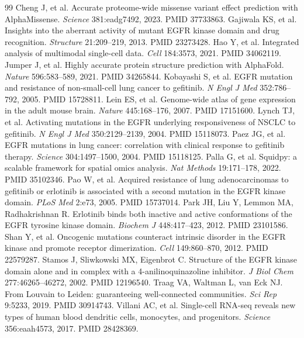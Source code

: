 \documentclass{cisXXX} %
\begin{document}
\small
\begin{thebibliography}{99}\setlength{\itemsep}{0pt}
 Cheng J, et al. Accurate proteome-wide missense variant effect prediction with AlphaMissense. \emph{Science} 381:eadg7492, 2023. PMID 37733863.
 Gajiwala KS, et al. Insights into the aberrant activity of mutant EGFR kinase domain and drug recognition. \emph{Structure} 21:209--219, 2013. PMID 23273428.
 Hao Y, et al. Integrated analysis of multimodal single-cell data. \emph{Cell} 184:3573, 2021. PMID 34062119.
 Jumper J, et al. Highly accurate protein structure prediction with AlphaFold. \emph{Nature} 596:583--589, 2021. PMID 34265844.
 Kobayashi S, et al. EGFR mutation and resistance of non-small-cell lung cancer to gefitinib. \emph{N Engl J Med} 352:786--792, 2005. PMID 15728811.
 Lein ES, et al. Genome-wide atlas of gene expression in the adult mouse brain. \emph{Nature} 445:168--176, 2007. PMID 17151600.
 Lynch TJ, et al. Activating mutations in the EGFR underlying responsiveness of NSCLC to gefitinib. \emph{N Engl J Med} 350:2129--2139, 2004. PMID 15118073.
 Paez JG, et al. EGFR mutations in lung cancer: correlation with clinical response to gefitinib therapy. \emph{Science} 304:1497--1500, 2004. PMID 15118125.
 Palla G, et al. Squidpy: a scalable framework for spatial omics analysis. \emph{Nat Methods} 19:171--178, 2022. PMID 35102346.
 Pao W, et al. Acquired resistance of lung adenocarcinomas to gefitinib or erlotinib is associated with a second mutation in the EGFR kinase domain. \emph{PLoS Med} 2:e73, 2005. PMID 15737014.
 Park JH, Liu Y, Lemmon MA, Radhakrishnan R. Erlotinib binds both inactive and active conformations of the EGFR tyrosine kinase domain. \emph{Biochem J} 448:417--423, 2012. PMID 23101586.
 Shan Y, et al. Oncogenic mutations counteract intrinsic disorder in the EGFR kinase and promote receptor dimerization. \emph{Cell} 149:860--870, 2012. PMID 22579287.
 Stamos J, Sliwkowski MX, Eigenbrot C. Structure of the EGFR kinase domain alone and in complex with a 4-anilinoquinazoline inhibitor. \emph{J Biol Chem} 277:46265--46272, 2002. PMID 12196540.
 Traag VA, Waltman L, van Eck NJ. From Louvain to Leiden: guaranteeing well-connected communities. \emph{Sci Rep} 9:5233, 2019. PMID 30914743.
 Villani AC, et al. Single-cell RNA-seq reveals new types of human blood dendritic cells, monocytes, and progenitors. \emph{Science} 356:eaah4573, 2017. PMID 28428369.

\end{thebibliography}
\end{document}
